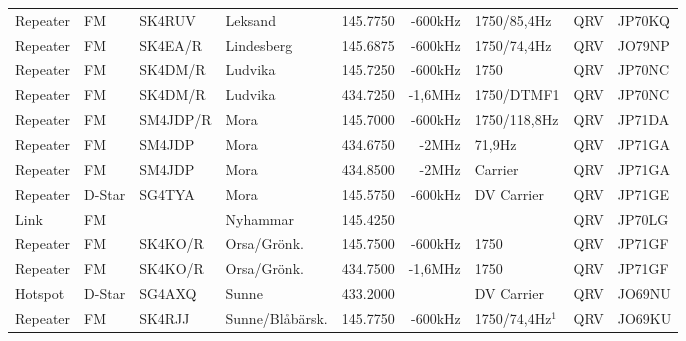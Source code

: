 \begin{landscape}
\begin{longtable}{llllrrlcl}
	Repeater          & FM           & SK4RUV        & Leksand             &          145.7750 &        -600kHz & 1750/85,4Hz     &       QRV       & JP70KQ           \\
	Repeater          & FM           & SK4EA/R       & Lindesberg          &          145.6875 &        -600kHz & 1750/74,4Hz     &       QRV       & JO79NP           \\
	Repeater          & FM           & SK4DM/R       & Ludvika             &          145.7250 &        -600kHz & 1750            &       QRV       & JP70NC           \\
	Repeater          & FM           & SK4DM/R       & Ludvika             &          434.7250 &        -1,6MHz & 1750/DTMF1      &       QRV       & JP70NC           \\
	Repeater          & FM           & SM4JDP/R      & Mora                &          145.7000 &        -600kHz & 1750/118,8Hz    &       QRV       & JP71DA           \\
	Repeater          & FM           & SM4JDP        & Mora                &          434.6750 &          -2MHz & 71,9Hz          &       QRV       & JP71GA           \\
	Repeater          & FM           & SM4JDP        & Mora                &          434.8500 &          -2MHz & Carrier         &       QRV       & JP71GA           \\
	Repeater          & D-Star       & SG4TYA        & Mora                &          145.5750 &        -600kHz & DV Carrier      &       QRV       & JP71GE           \\
	Link              & FM           &               & Nyhammar            &          145.4250 &                &                 &       QRV       & JP70LG           \\
	Repeater          & FM           & SK4KO/R       & Orsa/Grönk.         &          145.7500 &        -600kHz & 1750            &       QRV       & JP71GF           \\
	Repeater          & FM           & SK4KO/R       & Orsa/Grönk.         &          434.7500 &        -1,6MHz & 1750            &       QRV       & JP71GF           \\
	Hotspot           & D-Star       & SG4AXQ        & Sunne               &          433.2000 &                & DV Carrier      &       QRV       & JO69NU           \\
	Repeater          & FM           & SK4RJJ        & Sunne/Blåbärsk.     &          145.7750 &        -600kHz & 1750/74,4Hz$^1$ &       QRV       & JO69KU           \\

\end{longtable}
\end{landscape}
